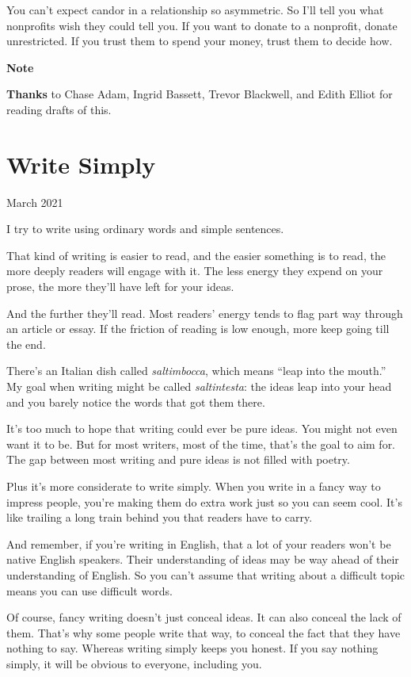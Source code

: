 \documentclass[12pt]{book}
\begin{document}
You can't expect candor in a relationship so asymmetric. So I'll tell
you what nonprofits wish they could tell you. If you want to donate to a
nonprofit, donate unrestricted. If you trust them to spend your money,
trust them to decide how.

\textbf{Note}

\textbf{Thanks} to Chase Adam, Ingrid Bassett, Trevor Blackwell, and
Edith Elliot for reading drafts of this.
\chapter{Write Simply}

March 2021

I try to write using ordinary words and simple sentences.

That kind of writing is easier to read, and the easier something is to
read, the more deeply readers will engage with it. The less energy they
expend on your prose, the more they'll have left for your ideas.

And the further they'll read. Most readers' energy tends to flag part
way through an article or essay. If the friction of reading is low
enough, more keep going till the end.

There's an Italian dish called \emph{saltimbocca}, which means ``leap
into the mouth.'' My goal when writing might be called
\emph{saltintesta}: the ideas leap into your head and you barely notice
the words that got them there.

It's too much to hope that writing could ever be pure ideas. You might
not even want it to be. But for most writers, most of the time, that's
the goal to aim for. The gap between most writing and pure ideas is not
filled with poetry.

Plus it's more considerate to write simply. When you write in a fancy
way to impress people, you're making them do extra work just so you can
seem cool. It's like trailing a long train behind you that readers have
to carry.

And remember, if you're writing in English, that a lot of your readers
won't be native English speakers. Their understanding of ideas may be
way ahead of their understanding of English. So you can't assume that
writing about a difficult topic means you can use difficult words.

Of course, fancy writing doesn't just conceal ideas. It can also conceal
the lack of them. That's why some people write that way, to conceal the
fact that they have
\href{https://scholar.google.com/scholar?hl=en&as_sdt=0\%2C5&q=hermeneutic+dialectics+hegemonic+modalities}{}nothing
to say. Whereas writing simply keeps you honest. If you say nothing
simply, it will be obvious to everyone, including you.
\end{document}
